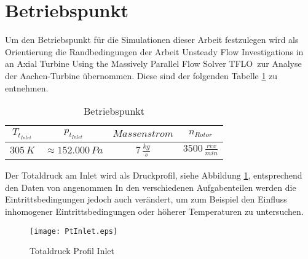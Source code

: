 \section{Betriebspunkt}
\label{subsec:aachensetup}
Um den Betriebspunkt für die Simulationen dieser Arbeit festzulegen wird als Orientierung die Randbedingungen der Arbeit \glqq Unsteady Flow Investigations in an
Axial Turbine Using the Massively
Parallel Flow Solver TFLO\grqq \, \cite{ufi2001YaoDavis} zur Analyse der Aachen-Turbine übernommen. Diese sind der folgenden Tabelle \ref{tab:aachensetup} zu entnehmen.
\begin{table}[H]
\centering
\caption{Betriebspunkt} \label{tab:aachensetup}
\begin{tabular}{ c| c| c| c}
$T_{t_{Inlet}}$&$p_{t_{Inlet}}$&$Massenstrom$&$n_{Rotor}$\\
\hline
$305 \, K$&$\approx152.000 \, Pa$&$7 \, \frac{kg}{s}$&$3500 \, \frac{rev}{min}$\\
\end{tabular}
\end{table}
Der Totaldruck am Inlet wird als Druckprofil, siehe Abbildung \ref{fig:ptinlet}, entsprechend den Daten von \cite[p. 4]{ufi2001YaoDavis} angenommen
In den verschiedenen Aufgabenteilen werden die Eintrittsbedingungen jedoch auch verändert, um zum Beispiel den Einfluss inhomogener Eintrittsbedingungen oder höherer Temperaturen zu untersuchen.

\begin{figure}[htbp]
	\centering
	\texttt{[image: PtInlet.eps]}
	\caption{Totaldruck Profil Inlet} \label{fig:ptinlet}
\end{figure}







